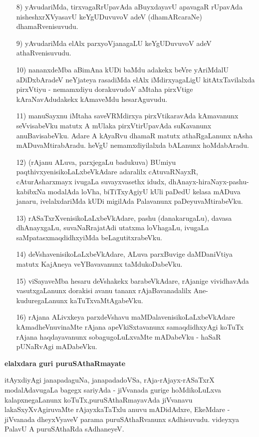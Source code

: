 \begin{itemize}
\item [8)] yAvudariMda, tirxvagaRrUpavAda aBuyxdayavU apavagaR rUpavAda nisheshxrXVyasavU keYgUDu\-vuvoV adeV (dhamARcaraNe) dhamaRvenisuvudu.
\item [9)] yAvudariMda elAlx parxyoVjanagaLU keYgUDuvuvoV adeV athaRvenisuvudu.
\item [10)] nananxdeMba aBimAna kUDi baMdu adakekx beVre yAriMdalU aDiDxbAradeV neYjateya rasadiMda elAlx iMdirxyagaLigU kitAtxTavilalxda pirxVtiyu - nemamxdiyu dorakuvudoV aMtaha pirxVtige kAraNavAdudakekx kAmaveMdu hesarAguvudu. 
\item [11)] manuSayxnu iMtaha saveVRMdirxya pirxVtikaravAda kAmavanunx seVvisabeVku matutx A mUlaka pirxVtirUpavAda suKavanunx anuBavisabeVku. Adare A kAyaRvu dhamaR matutx athaRgaLanunx nAsha mADuvaMtirabAradu. heVgU nemamxdiyilalxda bALanunx hoMdabAradu.
\item [12)] (rAjanu ALuva, parxjegaLu badukuva) BUmiyu paqthivxyenisikoLaLx\-beVkAdare adaralilx cAtu\-vaR\-NayxR, cAturAsharxmayx ivugaLa suvayxvasethx idudx, dhAnayx-hiraNayx-pashu-kabibxNa modalAda \-loVha, biTiTxyAgiyU kUli paDedU kelasa mADuva janaru, ivelalxdariMda kUDi migilAda Pala\-vanunx paDeyuvaMtirabeVku.
\item [13)] rASaTxrXvenisikoLaLxbeVkAdare, pashu (danakarugaLu), davasa dhAnayxgaLu, suvaNaRrajatAdi utatxma loVhagaLu, ivugaLa saMpatasxmaqdidhxyiMda beLagutitxrabeVku.
\item [14)] deVshavenisikoLaLxbeVkAdare, ALuva parxBuvige daMDaniVtiya matutx KajAneya veYBavavanunx taMdu\-koDa\-beVku.
\item [15)] viSayaveMba hesaru deVshakekx barabeVkAdare, rAjanige vividhavAda vasutxgaLanunx dorakisi avanu tananx rAjaBavanadalilx Ane-kuduregaLanunx kaTuTxvaMtAgabeVku.
\item [16)] rAjana ALivxkeya parxdeVshavu maMDalavenisikoLaLxbeVkAdare kAmadheVnuvinaMte rAjana apeVkiSxta\-vanunx samaqdidhxyAgi koTuTx rAjana haqdayavanunx sobagugoLuLxvaMte mADabeVku - haSaR pUNaR\-vAgi mADabeVku.
\end{itemize}

{\bigskip
\noindent
{\large\bf elalxdara guri puruSAthaRmayate}}\label{page96}
\medskip

\noindent
itAyxdiyAgi janapadaguNa, janapadadoVSa, rAja-rAjayx-rASaTxrX modalAdavu\-gaLa bagegx sari\-yAda -\- jiVvanada gurige hoMdikoLuLxva kalapxnegaLanunx koTuTx,\break puruSAthaRmayavAda jiVvanavu lakaSxyXvAgiru\-vaMte rAjayxkaTaTxlu anuvu mADi\-dAdxre, EkeMdare - jiVvanada dheyxVyaveV parama puruSAthaRvanunx sAdhisu\-vudu. videyxya PalavU A puruSAthaRda sAdhaneyeV.

